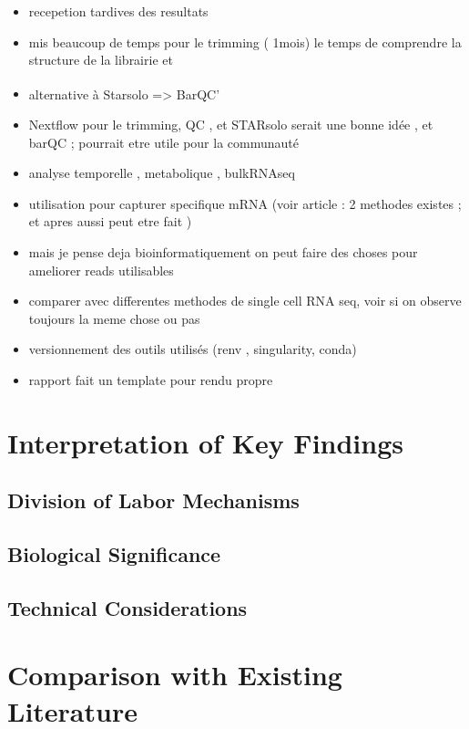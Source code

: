 \documentclass[
  11pt,
  a4paper,
]{report}
\begin{document}
\begin{itemize}
\item
  recepetion tardives des resultats
\item
  mis beaucoup de temps pour le trimming ( 1mois) le temps de comprendre
  la structure de la librairie et
\item
  alternative à Starsolo =\textgreater{}
  BarQC'\textsuperscript{}
\item
  Nextflow pour le trimming, QC , et STARsolo serait une bonne idée , et
  barQC ; pourrait etre utile pour la communauté
\item
  analyse temporelle , metabolique , bulkRNAseq
\item
  utilisation pour capturer specifique mRNA (voir article : 2 methodes
  existes ; et apres aussi peut etre fait )
\item
  mais je pense deja bioinformatiquement on peut faire des choses pour
  ameliorer reads utilisables
\item
  comparer avec differentes methodes de single cell RNA seq, voir si on
  observe toujours la meme chose ou pas
\item
  versionnement des outils utilisés (renv , singularity, conda)
\item
  rapport fait un template pour rendu propre
\end{itemize}

\section{Interpretation of Key
Findings}\label{interpretation-of-key-findings}

\subsection{Division of Labor
Mechanisms}\label{division-of-labor-mechanisms}

\subsection{Biological Significance}\label{biological-significance}

\subsection{Technical Considerations}\label{technical-considerations}

\section{Comparison with Existing
Literature}\label{comparison-with-existing-literature}
\end{document}
